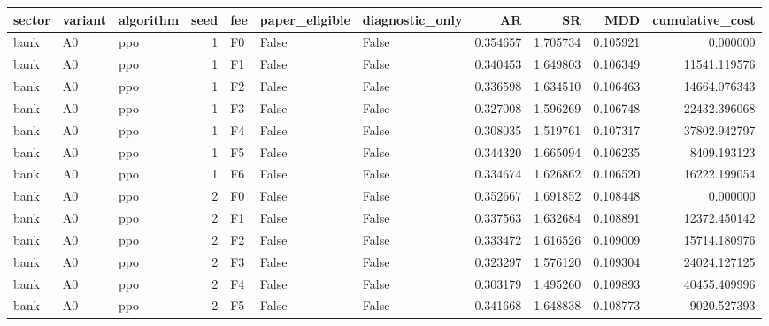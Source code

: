 \begin{tabular}{lllrlllrrrr}
\toprule
    sector & variant & algorithm &  seed & fee &  paper\_eligible &  diagnostic\_only &        AR &        SR &      MDD &  cumulative\_cost \\
\midrule
      bank &      A0 &       ppo &     1 &  F0 &           False &            False &  0.354657 &  1.705734 & 0.105921 &         0.000000 \\
      bank &      A0 &       ppo &     1 &  F1 &           False &            False &  0.340453 &  1.649803 & 0.106349 &     11541.119576 \\
      bank &      A0 &       ppo &     1 &  F2 &           False &            False &  0.336598 &  1.634510 & 0.106463 &     14664.076343 \\
      bank &      A0 &       ppo &     1 &  F3 &           False &            False &  0.327008 &  1.596269 & 0.106748 &     22432.396068 \\
      bank &      A0 &       ppo &     1 &  F4 &           False &            False &  0.308035 &  1.519761 & 0.107317 &     37802.942797 \\
      bank &      A0 &       ppo &     1 &  F5 &           False &            False &  0.344320 &  1.665094 & 0.106235 &      8409.193123 \\
      bank &      A0 &       ppo &     1 &  F6 &           False &            False &  0.334674 &  1.626862 & 0.106520 &     16222.199054 \\
      bank &      A0 &       ppo &     2 &  F0 &           False &            False &  0.352667 &  1.691852 & 0.108448 &         0.000000 \\
      bank &      A0 &       ppo &     2 &  F1 &           False &            False &  0.337563 &  1.632684 & 0.108891 &     12372.450142 \\
      bank &      A0 &       ppo &     2 &  F2 &           False &            False &  0.333472 &  1.616526 & 0.109009 &     15714.180976 \\
      bank &      A0 &       ppo &     2 &  F3 &           False &            False &  0.323297 &  1.576120 & 0.109304 &     24024.127125 \\
      bank &      A0 &       ppo &     2 &  F4 &           False &            False &  0.303179 &  1.495260 & 0.109893 &     40455.409996 \\
      bank &      A0 &       ppo &     2 &  F5 &           False &            False &  0.341668 &  1.648838 & 0.108773 &      9020.527393 \\

\end{tabular}
